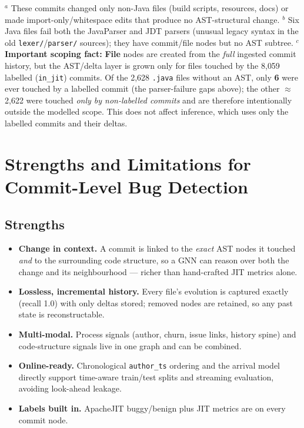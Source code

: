 \documentclass[11pt,a4paper]{article}
\newcommand{\code}[1]{\texttt{#1}}
\newcommand{\node}[1]{\textcolor{kgblue}{\textbf{#1}}}
\begin{document}
\footnotesize
$^{a}$ These commits changed only non-Java files (build scripts, resources,
docs) or made import-only/whitespace edits that produce no AST-structural change.
$^{b}$ Six Java files fail both the JavaParser and JDT parsers (unusual legacy
syntax in the old \texttt{lexer/}/\texttt{parser/} sources); they have
commit/file nodes but no AST subtree. $^{c}$ \textbf{Important scoping fact:}
\node{File} nodes are created from the \emph{full} ingested commit history, but
the AST/delta layer is grown only for files touched by the 8{,}059 labelled
(\code{in\_jit}) commits. Of the 2{,}628 \texttt{.java} files without an AST,
only \textbf{6} were ever touched by a labelled commit (the parser-failure gaps
above); the other $\approx$2{,}622 were touched \emph{only by non-labelled
commits} and are therefore intentionally outside the modelled scope. This does
not affect inference, which uses only the labelled commits and their deltas.
\normalsize

\section{Strengths and Limitations for Commit-Level Bug Detection}
\subsection*{Strengths}
\begin{itemize}[nosep]
  \item \textbf{Change in context.} A commit is linked to the \emph{exact} AST
        nodes it touched \emph{and} to the surrounding code structure, so a GNN
        can reason over both the change and its neighbourhood --- richer than
        hand-crafted JIT metrics alone.
  \item \textbf{Lossless, incremental history.} Every file's evolution is
        captured exactly (recall 1.0) with only deltas stored; removed nodes are
        retained, so any past state is reconstructable.
  \item \textbf{Multi-modal.} Process signals (author, churn, issue links,
        history spine) and code-structure signals live in one graph and can be
        combined.
  \item \textbf{Online-ready.} Chronological \code{author\_ts} ordering and the
        arrival model directly support time-aware train/test splits and
        streaming evaluation, avoiding look-ahead leakage.
  \item \textbf{Labels built in.} ApacheJIT buggy/benign plus JIT metrics are on
        every commit node.
\end{itemize}
\end{document}
